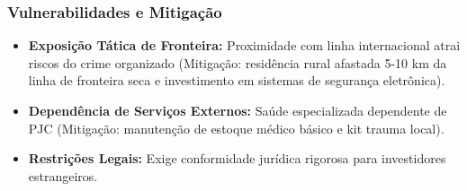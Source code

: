 \subsubsection{Vulnerabilidades e
Mitigação}

\begin{itemize}
\tightlist
\item
  \textbf{Exposição Tática de Fronteira:} Proximidade com linha
  internacional atrai riscos do crime organizado (Mitigação: residência
  rural afastada 5-10 km da linha de fronteira seca e investimento em
  sistemas de segurança eletrônica).
\item
  \textbf{Dependência de Serviços Externos:} Saúde especializada
  dependente de PJC (Mitigação: manutenção de estoque médico básico e
  kit trauma local).
\item
  \textbf{Restrições Legais:} Exige conformidade jurídica rigorosa para
  investidores estrangeiros.
\end{itemize}

